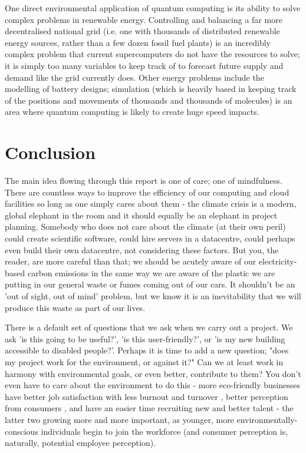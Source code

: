 \documentclass{article}
\begin{document}
One direct environmental application of quantum computing is its ability to solve complex problems in renewable energy. Controlling and balancing a far more decentralised national grid (i.e. one with thousands of distributed renewable energy sources, rather than a few dozen fossil fuel plants) is an incredibly complex problem that current supercomputers do not have the resources to solve; it is simply too many variables to keep track of to forecast future supply and demand like the grid currently does. Other energy problems include the modelling of battery designs; simulation (which is heavily based in keeping track of the positions and movements of thousands and thousands of molecules) is an area where quantum computing is likely to create huge speed impacts. \citep{giani2021quantum}

\section{Conclusion}
The main idea flowing through this report is one of care; one of mindfulness. There are countless ways to improve the efficiency of our computing and cloud facilities so long as one simply cares about them - the climate crisis is a modern, global elephant in the room and it should equally be an elephant in project planning. Somebody who does not care about the climate (at their own peril) could create scientific software, could hire servers in a datacentre, could perhaps even build their own datacentre, not considering these factors. But you, the reader, are more careful than that; we should be acutely aware of our electricity-based carbon emissions in the same way we are aware of the plastic we are putting in our general waste or fumes coming out of our cars. It shouldn't be an 'out of sight, out of mind' problem, but we know it is an inevitability that we will produce this waste as part of our lives.\newline

There is a default set of questions that we ask when we carry out a project. We ask 'is this going to be useful?', 'is this user-friendly?', or 'is my new building accessible to disabled people?'. Perhaps it is time to add a new question; "does my project work for the environment, or against it?" Can we at least work in harmony with environmental goals, or even better, contribute to them? You don't even have to care about the environment to do this - more eco-friendly businesses have better job satisfaction with less burnout and turnover \citep{yu2020hotels} \citep{reverte2016influence}, better perception from consumers \citep{miles1993eco}, and have an easier time recruiting new and better talent \citep{aranganathan2018green} - the latter two growing more and more important, as younger, more environmentally-conscious individuals begin to join the workforce (and consumer perception is, naturally, potential employee perception).\newline
\end{document}
